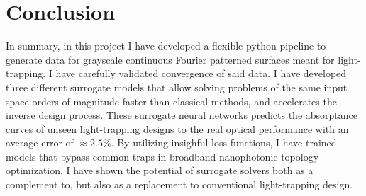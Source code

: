 \chapter{Conclusion}
\label{sec:conclusion}
In summary, in this project I have developed a flexible python pipeline to generate data for grayscale continuous Fourier patterned surfaces meant for light-trapping.
I have carefully validated convergence of said data. I have developed three different surrogate models that allow solving problems of the same input space orders of magnitude faster than classical methods, and accelerates the inverse design process.
These surrogate neural networks predicts the absorptance curves of unseen light-trapping designs to the real optical performance with an average error of $\approx 2.5\%$. By utilizing insighful loss functions, I have trained models that bypass common traps in broadband nanophotonic topology optimization.
I have shown the potential of surrogate solvers both as a complement to, but also as a replacement to conventional light-trapping design.
